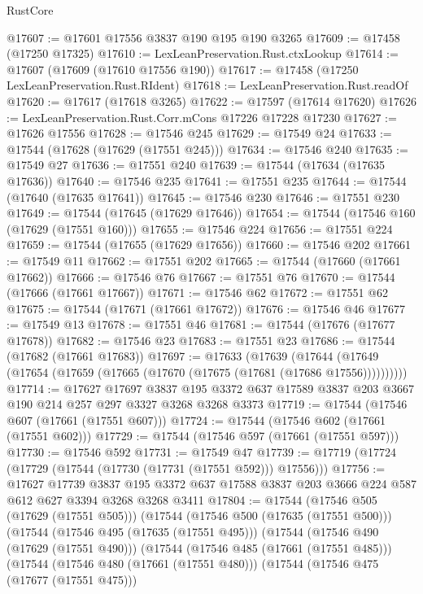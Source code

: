 \begin{lexlean}{RustCore}
\begin{coremodule}
@17607 := @17601 @17556 @3837 @190 @195 @190 @3265
@17609 := @17458 (@17250 @17325)
@17610 := LexLeanPreservation.Rust.ctxLookup
@17614 := @17607 (@17609 (@17610 @17556 @190))
@17617 := @17458 (@17250 LexLeanPreservation.Rust.RIdent)
@17618 := LexLeanPreservation.Rust.readOf
@17620 := @17617 (@17618 @3265)
@17622 := @17597 (@17614 @17620)
@17626 := LexLeanPreservation.Rust.Corr.mCons @17226 @17228 @17230
@17627 := @17626 @17556
@17628 := @17546 @245
@17629 := @17549 @24
@17633 := @17544 (@17628 (@17629 (@17551 @245)))
@17634 := @17546 @240
@17635 := @17549 @27
@17636 := @17551 @240
@17639 := @17544 (@17634 (@17635 @17636))
@17640 := @17546 @235
@17641 := @17551 @235
@17644 := @17544 (@17640 (@17635 @17641))
@17645 := @17546 @230
@17646 := @17551 @230
@17649 := @17544 (@17645 (@17629 @17646))
@17654 := @17544 (@17546 @160 (@17629 (@17551 @160)))
@17655 := @17546 @224
@17656 := @17551 @224
@17659 := @17544 (@17655 (@17629 @17656))
@17660 := @17546 @202
@17661 := @17549 @11
@17662 := @17551 @202
@17665 := @17544 (@17660 (@17661 @17662))
@17666 := @17546 @76
@17667 := @17551 @76
@17670 := @17544 (@17666 (@17661 @17667))
@17671 := @17546 @62
@17672 := @17551 @62
@17675 := @17544 (@17671 (@17661 @17672))
@17676 := @17546 @46
@17677 := @17549 @13
@17678 := @17551 @46
@17681 := @17544 (@17676 (@17677 @17678))
@17682 := @17546 @23
@17683 := @17551 @23
@17686 := @17544 (@17682 (@17661 @17683))
@17697 := @17633
    (@17639 (@17644 (@17649 (@17654 (@17659 (@17665 (@17670 (@17675 (@17681 (@17686 @17556))))))))))
@17714 := @17627
    @17697
    @3837
    @195
    @3372
    @637
    @17589
    @3837
    @203
    @3667
    @190
    @214
    @257
    @297
    @3327
    @3268
    @3268
    @3373
@17719 := @17544 (@17546 @607 (@17661 (@17551 @607)))
@17724 := @17544 (@17546 @602 (@17661 (@17551 @602)))
@17729 := @17544 (@17546 @597 (@17661 (@17551 @597)))
@17730 := @17546 @592
@17731 := @17549 @47
@17739 := @17719 (@17724 (@17729 (@17544 (@17730 (@17731 (@17551 @592))) @17556)))
@17756 := @17627
    @17739
    @3837
    @195
    @3372
    @637
    @17588
    @3837
    @203
    @3666
    @224
    @587
    @612
    @627
    @3394
    @3268
    @3268
    @3411
@17804 := @17544
    (@17546 @505 (@17629 (@17551 @505)))
    (@17544
      (@17546 @500 (@17635 (@17551 @500)))
      (@17544
        (@17546 @495 (@17635 (@17551 @495)))
        (@17544
          (@17546 @490 (@17629 (@17551 @490)))
          (@17544
            (@17546 @485 (@17661 (@17551 @485)))
            (@17544
              (@17546 @480 (@17661 (@17551 @480)))
              (@17544
                (@17546 @475 (@17677 (@17551 @475)))

\end{coremodule}
\end{lexlean}
